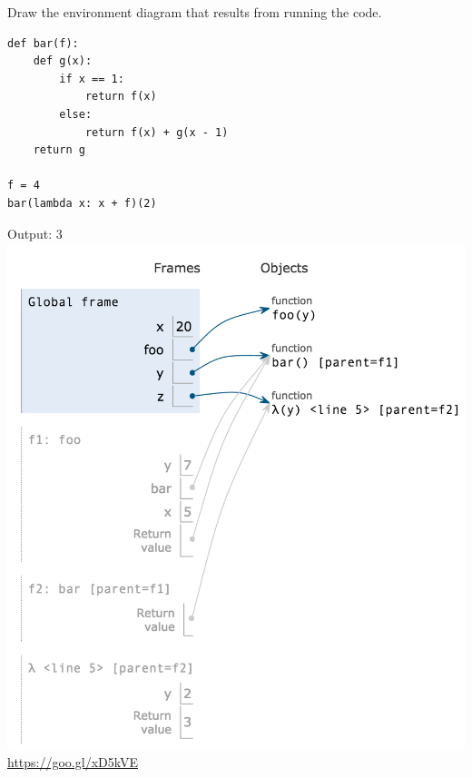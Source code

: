 \begin{blocksection}
\question Draw the environment diagram that results from running the code.

\begin{lstlisting}
def bar(f):
    def g(x):
        if x == 1:
            return f(x)
        else:
            return f(x) + g(x - 1)
    return g

f = 4
bar(lambda x: x + f)(2)
\end{lstlisting}

\begin{solution}[0.3in]
Output: 3 \newline
\includegraphics[scale=0.5]{foobar1.png}
\newline
\url{https://goo.gl/xD5kVE}
\end{solution}
\end{blocksection}
